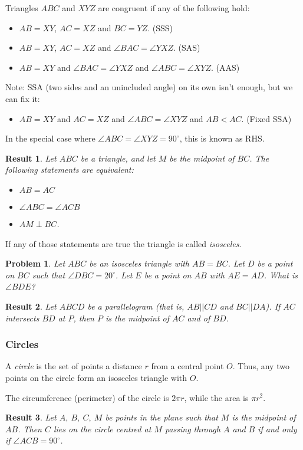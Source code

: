 \documentclass{amsart}
\newtheorem{problem}{Problem}[subsubsection]
\newtheorem{result}{Result}[subsubsection]
\begin{document}
Triangles $ABC$ and $XYZ$ are congruent if any of the following hold:
\begin{itemize}
  \item $AB=XY$, $AC=XZ$ and $BC=YZ$. (SSS)
  \item $AB=XY$, $AC=XZ$ and $\angle BAC=\angle YXZ$. (SAS)
  \item $AB=XY$ and $\angle BAC=\angle YXZ$ and $\angle ABC=\angle XYZ$. (AAS)
\end{itemize}
Note: SSA (two sides and an unincluded angle) on its own isn't enough, but we
can fix it:
\begin{itemize}
  \item $AB=XY$ and $AC=XZ$ and $\angle ABC=\angle XYZ$ and $AB<AC$. (Fixed SSA)
\end{itemize}
In the special case where $\angle ABC=\angle XYZ=90^\circ$, this is known as RHS.\@
\begin{result}{\label{r:b:g:c:1}}
  Let $ABC$ be a triangle, and let $M$ be the midpoint of $BC$.
  The following statements are equivalent:
  \begin{itemize}
    \item $AB=AC$
    \item $\angle ABC=\angle ACB$
    \item $AM\perp BC$.
  \end{itemize}
\end{result}
If any of those statements are true the triangle is called \emph{isosceles}.
\begin{problem}
  Let $ABC$ be an isosceles triangle with $AB=BC$. Let $D$ be a point on $BC$
  such that $\angle DBC=20^\circ$. Let $E$ be a point on $AB$ with $AE=AD$. What
  is $\angle BDE$?
\end{problem}
\begin{result}{\label{r:b:g:c:2}}
  Let $ABCD$ be a parallelogram (that is, $AB||CD$ and $BC||DA$). If $AC$
  intersects $BD$ at $P$, then $P$ is the midpoint of $AC$ and of $BD$.
\end{result}
\subsubsection{Circles}
A \emph{circle} is the set of points a distance $r$ from a central point $O$.
Thus, any two points on the circle form an isosceles triangle with $O$.

The circumference (perimeter) of the circle is $2\pi r$, while the area is $\pi
r^2$.
\begin{result}{\label{r:b:g:ci:1}}
  Let $A,\ B,\ C,\ M$ be points in the plane such that $M$ is the midpoint of
  $AB$. Then $C$ lies on the circle centred at $M$ passing through $A$ and $B$
  if and only if $\angle ACB=90^\circ$.
\end{result}
\end{document}
